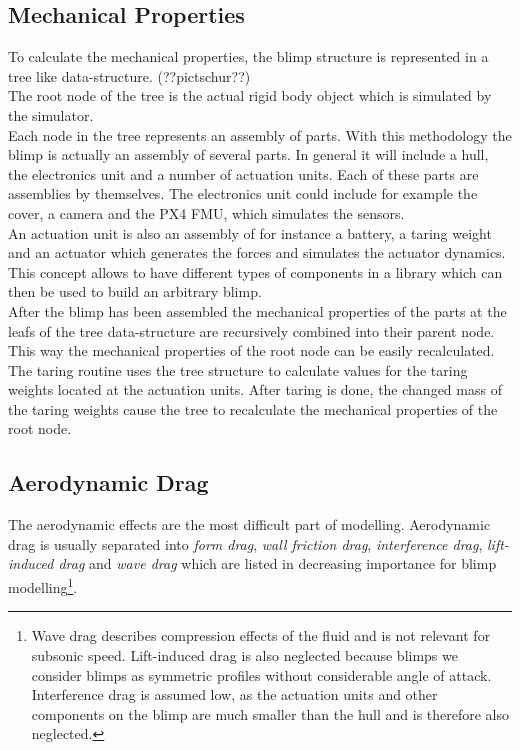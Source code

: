 \subsection{Mechanical Properties}
\label{sub:mech_properties}
To calculate the mechanical properties, the blimp structure is represented in a tree like data-structure. (??pictschur??)\\
The root node of the tree is the actual rigid body object which is simulated by the simulator.\\
Each node in the tree represents an assembly of parts.
With this methodology the blimp is actually an assembly of several parts. 
In general it will include a hull, the electronics unit and a number of actuation units.
Each of these parts are assemblies by themselves.
The electronics unit could include for example the cover, a camera and the PX4 FMU, which simulates the sensors.\\
An actuation unit is also an assembly of for instance a battery, a taring weight and an actuator which generates the forces and simulates the actuator dynamics.\\
This concept allows to have different types of components in a library which can then be used to build an arbitrary blimp.\\
After the blimp has been assembled the mechanical properties of the parts at the leafs of the tree data-structure are recursively combined into their parent node. 
This way the mechanical properties of the root node can be easily recalculated.\\
The taring routine uses the tree structure to calculate values for the taring weights located at the actuation units. 
After taring is done, the changed mass of the taring weights cause the tree to recalculate the mechanical properties of the root node.

\subsection{Aerodynamic Drag}
\label{sub:aero_drag}
The aerodynamic effects are the most difficult part of modelling.
Aerodynamic drag is usually separated into \textit{form drag}, \textit{wall friction drag}, \textit{interference drag}, \textit{lift-induced drag} and \textit{wave drag} which are listed in decreasing importance for blimp modelling\footnote{
Wave drag describes compression effects of the fluid and is not relevant for subsonic speed.
Lift-induced drag is also neglected because blimps we consider blimps as symmetric profiles without considerable angle of attack.
Interference drag is assumed low, as the actuation units and other components on the blimp are much smaller than the hull and is therefore also neglected.
}.

